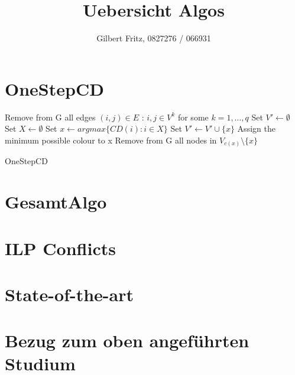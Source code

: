 \documentclass{article}
\title{Uebersicht Algos}
\author{Gilbert Fritz, 0827276 / 066931}
\begin{document}
\maketitle

\section{OneStepCD}

\begin{algorithm}
Remove from G all edges $(i,j) \in E$ : $i,j \in V^k$ for some $k=1,\ldots,q$\; 
Set $V' \gets \emptyset $\;
 {
  Set $X \gets \emptyset $\;
  Set $x \gets argmax\{CD(i) : i \in X \}$\;
  Set $V' \gets V' \cup \{x\}$\;
  Assign the minimum possible colour to x\;
  Remove from G all nodes in $V_{c(x)} \setminus \{x\} $
}
\caption{{\sc OneStepCD}}
\label{algo:max}
\end{algorithm}


\section{GesamtAlgo}


\section{ILP Conflicts}


\section{State-of-the-art}
 

\section{Bezug zum oben angef\"uhrten Studium}


			     			      
\end{document}

